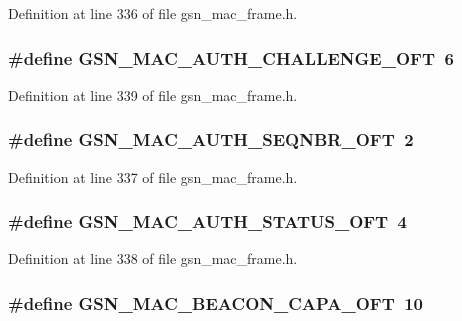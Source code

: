 Definition at line 336 of file gsn\_\-mac\_\-frame.h.

\hypertarget{a00523_a8e771c6f853f7df3e577138b4e39b060}{
\subsubsection[{GSN\_\-MAC\_\-AUTH\_\-CHALLENGE\_\-OFT}]{\setlength{\rightskip}{0pt plus 5cm}\#define GSN\_\-MAC\_\-AUTH\_\-CHALLENGE\_\-OFT~6}}
\label{a00523_a8e771c6f853f7df3e577138b4e39b060}


Definition at line 339 of file gsn\_\-mac\_\-frame.h.

\hypertarget{a00523_a9e5a9f12185cbe03f9bb26e44de0345d}{
\subsubsection[{GSN\_\-MAC\_\-AUTH\_\-SEQNBR\_\-OFT}]{\setlength{\rightskip}{0pt plus 5cm}\#define GSN\_\-MAC\_\-AUTH\_\-SEQNBR\_\-OFT~2}}
\label{a00523_a9e5a9f12185cbe03f9bb26e44de0345d}


Definition at line 337 of file gsn\_\-mac\_\-frame.h.

\hypertarget{a00523_a825b12a0f69b5b723b0a0762af43c9e2}{
\subsubsection[{GSN\_\-MAC\_\-AUTH\_\-STATUS\_\-OFT}]{\setlength{\rightskip}{0pt plus 5cm}\#define GSN\_\-MAC\_\-AUTH\_\-STATUS\_\-OFT~4}}
\label{a00523_a825b12a0f69b5b723b0a0762af43c9e2}


Definition at line 338 of file gsn\_\-mac\_\-frame.h.

\hypertarget{a00523_a4888d24c3eab5cfe331e2808fb61efea}{
\subsubsection[{GSN\_\-MAC\_\-BEACON\_\-CAPA\_\-OFT}]{\setlength{\rightskip}{0pt plus 5cm}\#define GSN\_\-MAC\_\-BEACON\_\-CAPA\_\-OFT~10}}
\label{a00523_a4888d24c3eab5cfe331e2808fb61efea}


